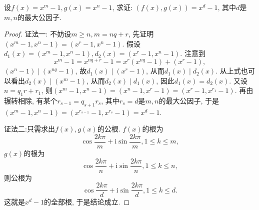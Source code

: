 \documentclass[../../main.tex]{subfiles}%
\begin{document}
\begin{proposition}\label{proposition:n方差的最大公因式}
设\(f(x)=x^m - 1, g(x)=x^n - 1\), 求证: \((f(x),g(x))=x^d - 1\), 其中\(d\)是\(m,n\)的最大公因子.
\end{proposition}
\begin{proof}

{\color{blue}证法一:}
不妨设\(m\geqslant  n, m = nq + r\), 先证明\((x^m - 1,x^n - 1)=(x^r - 1,x^n - 1)\). 假设\(d_1(x)=(x^m - 1,x^n - 1), d_2(x)=(x^r - 1,x^n - 1)\). 注意到
\[
x^m - 1=x^{nq + r}-1=x^r(x^{nq}-1)+(x^r - 1),
\]
\((x^n - 1)\mid(x^{nq}-1)\), 故\(d_1(x)\mid(x^r - 1)\), 从而\(d_1(x)\mid d_2(x)\). 从上式也可以看出\(d_2(x)\mid(x^m - 1)\), 从而\(d_2(x)\mid d_1(x)\), 因此\(d_1(x)=d_2(x)\). 又设\(n = q_1r + r_1\), 则\((x^m - 1,x^n - 1)=(x^n - 1,x^r - 1)=(x^r - 1,x^{r_1}-1)\). 再由辗转相除, 有某个\(r_{s - 1}=q_{s + 1}r_s\), 其中\(r_s = d\)是\(m,n\)的最大公因子, 于是\((x^m - 1,x^n - 1)=(x^{r_{s - 1}}-1,x^{r_s}-1)=x^d - 1\).

{\color{blue}证法二:}只需求出\(f(x),g(x)\)的公根. \(f(x)\)的根为
\[
\cos\frac{2k\pi}{m}+\mathrm{i}\sin\frac{2k\pi}{m}, 1\leqslant  k\leqslant  m,
\]
\(g(x)\)的根为
\[
\cos\frac{2k\pi}{n}+\mathrm{i}\sin\frac{2k\pi}{n}, 1\leqslant  k\leqslant  n,
\]
则公根为
\[
\cos\frac{2k\pi}{d}+\mathrm{i}\sin\frac{2k\pi}{d}, 1\leqslant  k\leqslant  d.
\]
这就是\(x^d - 1\)的全部根, 于是结论成立.

\end{proof}
\end{document}
